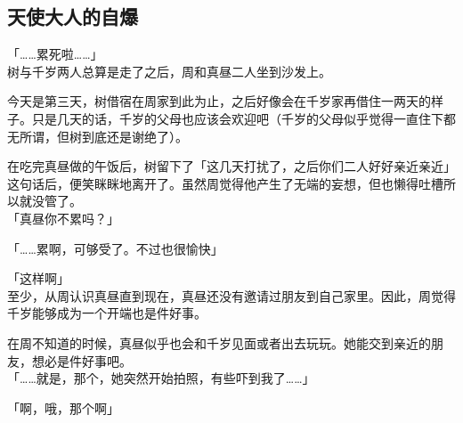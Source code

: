 \subsection{天使大人的自爆}

「……累死啦……」\\

树与千岁两人总算是走了之后，周和真昼二人坐到沙发上。

今天是第三天，树借宿在周家到此为止，之后好像会在千岁家再借住一两天的样子。只是几天的话，千岁的父母也应该会欢迎吧（千岁的父母似乎觉得一直住下都无所谓，但树到底还是谢绝了）。

在吃完真昼做的午饭后，树留下了「这几天打扰了，之后你们二人好好亲近亲近」这句话后，便笑眯眯地离开了。虽然周觉得他产生了无端的妄想，但也懒得吐槽所以就没管了。\\

「真昼你不累吗？」

「……累啊，可够受了。不过也很愉快」

「这样啊」\\

至少，从周认识真昼直到现在，真昼还没有邀请过朋友到自己家里。因此，周觉得千岁能够成为一个开端也是件好事。

在周不知道的时候，真昼似乎也会和千岁见面或者出去玩玩。她能交到亲近的朋友，想必是件好事吧。\\

「……就是，那个，她突然开始拍照，有些吓到我了……」

「啊，哦，那个啊」\\

